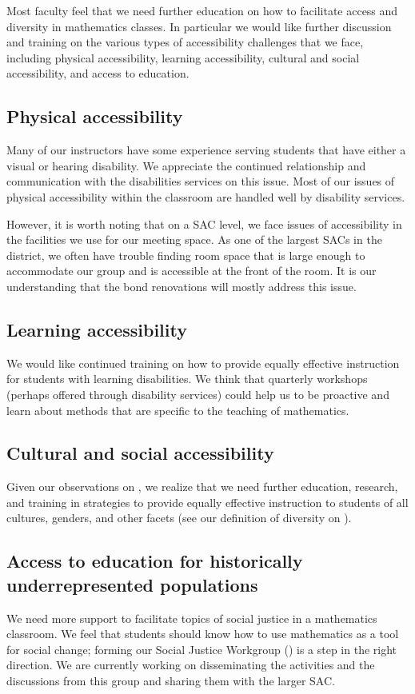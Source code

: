 Most faculty feel that we need further education on how to facilitate access
and diversity in mathematics classes. In particular we would like further
discussion and training on the various types of accessibility challenges that
we face, including physical accessibility, learning accessibility, cultural and
social accessibility, and access to education.

\subsection{Physical accessibility}
Many of our instructors have some experience serving students that have either
a visual or hearing disability. We appreciate the continued relationship and
communication with the disabilities services on this issue. Most of our issues
of physical accessibility within the classroom are handled well by disability
services.

However, it is worth noting that on a SAC level, we face issues of
accessibility in the facilities we use for our meeting space. As one of the
largest SACs in the district, we often have trouble finding room space that is
large enough to accommodate our group and is accessible at the front of the
room. It is our understanding that the bond renovations will mostly address
this issue.

\subsection{Learning accessibility}
We would like continued training on how to provide equally effective
instruction for students with learning disabilities. We think that quarterly
workshops (perhaps offered through disability services) could help us to be
proactive and learn about methods that are specific to the teaching of
mathematics.

\subsection{Cultural and social accessibility}
Given our observations on , we realize that we need
further education, research, and training in strategies to provide equally
effective instruction to students of all cultures, genders, and other facets
(see our definition of diversity on ).

\subsection{Access to education for historically underrepresented populations}
We need more support to facilitate topics of social justice in a mathematics classroom. We
feel that students should know how to use mathematics as a tool for social
change; forming our Social Justice Workgroup () is
a step in the right direction. We are currently working on disseminating the activities and the discussions from this
group and sharing them with the larger SAC.


